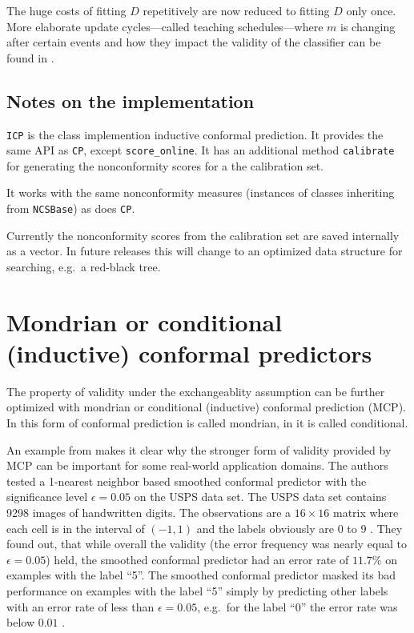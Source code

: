 \documentclass[twoside,11pt]{article}
\begin{document}
The huge costs of fitting $D$ repetitively are now reduced
to fitting $D$ only once.
More elaborate update cycles---called teaching
schedules---where $m$ is changing after certain events
and how they impact the validity of the classifier can be
found in \citet[Chapters 4.3, 4.4]{alrw}.

\subsection*{Notes on the implementation}

\texttt{ICP} is the class implemention inductive conformal
prediction. It provides the same API as \texttt{CP},
except \texttt{score\_online}. It has an additional method
\texttt{calibrate} for generating the nonconformity scores
for a the calibration set.

It works with the same nonconformity measures (instances
of classes inheriting from \texttt{NCSBase}) as does
\texttt{CP}.

Currently the nonconformity scores from the calibration set
are saved internally as a vector. In future releases this
will change to an optimized data structure for searching,
e.g.\ a red-black tree.

\section{Mondrian or conditional (inductive) conformal
         predictors}
\label{sec:mcp}

The property of validity under the exchangeablity
assumption can be further optimized with mondrian or
conditional (inductive) conformal prediction (MCP).
In \citet[Chapter 4.5]{alrw} this form of conformal
prediction is called mondrian, in \citet[Chapter 2]{cprml}
it is called conditional.

An example from \citet[Chapter 4.5]{alrw} makes it clear
why the stronger form of validity provided by MCP can be
important for some real-world application domains.
The authors tested a 1-nearest neighbor based smoothed
conformal predictor with the significance level
$\epsilon=0.05$ on the USPS data set.
The USPS data set contains 9298 images of handwritten
digits.
The observations are a $16 \times 16$ matrix where each
cell is in the interval of $(-1,1)$ and the labels
obviously are 0 to 9 \citep[see][]{lecun_et_al_1989}.
They found out, that while overall the validity (the error
frequency was nearly equal to $\epsilon=0.05$) held, the
smoothed conformal predictor had an error rate of $11.7\%$
on examples with the label ``5''.
The smoothed conformal predictor masked its bad performance
on examples with the label ``5'' simply by predicting other
labels with an error rate of less than $\epsilon = 0.05$,
e.g.\ for the label ``0'' the error rate was below $0.01$
\citep[see][Chapter 4.5]{alrw}.
\end{document}
